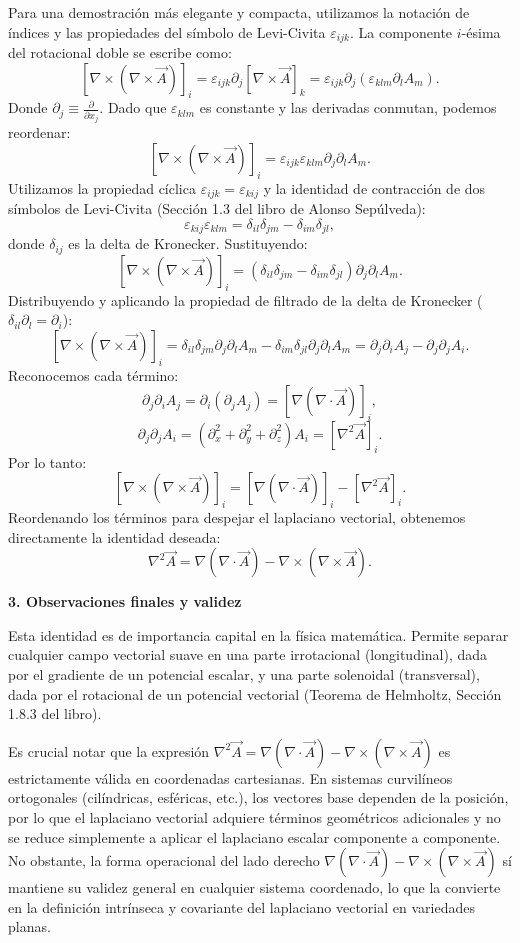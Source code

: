 \documentclass[a4paper]{article}
\begin{document}
Para una demostración más elegante y compacta, utilizamos la notación de índices y las propiedades del símbolo de Levi-Civita $\varepsilon_{ijk}$. La componente $i$-ésima del rotacional doble se escribe como:
$$
[\nabla \times (\nabla \times \vec{A})]_i = \varepsilon_{ijk} \partial_j [\nabla \times \vec{A}]_k = \varepsilon_{ijk} \partial_j (\varepsilon_{klm} \partial_l A_m).
$$
Donde $\partial_j \equiv \frac{\partial}{\partial x_j}$. Dado que $\varepsilon_{klm}$ es constante y las derivadas conmutan, podemos reordenar:
$$
[\nabla \times (\nabla \times \vec{A})]_i = \varepsilon_{ijk} \varepsilon_{klm} \partial_j \partial_l A_m.
$$
Utilizamos la propiedad cíclica $\varepsilon_{ijk} = \varepsilon_{kij}$ y la identidad de contracción de dos símbolos de Levi-Civita (Sección 1.3 del libro de Alonso Sepúlveda):
$$
\varepsilon_{kij} \varepsilon_{klm} = \delta_{il}\delta_{jm} - \delta_{im}\delta_{jl},
$$
donde $\delta_{ij}$ es la delta de Kronecker. Sustituyendo:
$$
[\nabla \times (\nabla \times \vec{A})]_i = (\delta_{il}\delta_{jm} - \delta_{im}\delta_{jl}) \partial_j \partial_l A_m.
$$
Distribuyendo y aplicando la propiedad de filtrado de la delta de Kronecker ($\delta_{il} \partial_l = \partial_i$):
$$
[\nabla \times (\nabla \times \vec{A})]_i = \delta_{il}\delta_{jm} \partial_j \partial_l A_m - \delta_{im}\delta_{jl} \partial_j \partial_l A_m = \partial_j \partial_i A_j - \partial_j \partial_j A_i.
$$
Reconocemos cada término:
$$
\partial_j \partial_i A_j = \partial_i (\partial_j A_j) = [\nabla(\nabla \cdot \vec{A})]_i,
$$
$$
\partial_j \partial_j A_i = (\partial_x^2 + \partial_y^2 + \partial_z^2) A_i = [\nabla^2 \vec{A}]_i.
$$
Por lo tanto:
$$
[\nabla \times (\nabla \times \vec{A})]_i = [\nabla(\nabla \cdot \vec{A})]_i - [\nabla^2 \vec{A}]_i.
$$
Reordenando los términos para despejar el laplaciano vectorial, obtenemos directamente la identidad deseada:
$$
\nabla^2 \vec{A} = \nabla(\nabla \cdot \vec{A}) - \nabla \times (\nabla \times \vec{A}).
$$

\vspace{0.3cm}
\noindent\textbf{3. Observaciones finales y validez}

Esta identidad es de importancia capital en la física matemática. Permite separar cualquier campo vectorial suave en una parte irrotacional (longitudinal), dada por el gradiente de un potencial escalar, y una parte solenoidal (transversal), dada por el rotacional de un potencial vectorial (Teorema de Helmholtz, Sección 1.8.3 del libro). 

Es crucial notar que la expresión $\nabla^2 \vec{A} = \nabla(\nabla \cdot \vec{A}) - \nabla \times (\nabla \times \vec{A})$ es estrictamente válida en coordenadas cartesianas. En sistemas curvilíneos ortogonales (cilíndricas, esféricas, etc.), los vectores base dependen de la posición, por lo que el laplaciano vectorial adquiere términos geométricos adicionales y no se reduce simplemente a aplicar el laplaciano escalar componente a componente. No obstante, la forma operacional del lado derecho $\nabla(\nabla \cdot \vec{A}) - \nabla \times (\nabla \times \vec{A})$ sí mantiene su validez general en cualquier sistema coordenado, lo que la convierte en la definición intrínseca y covariante del laplaciano vectorial en variedades planas.
\end{document}
